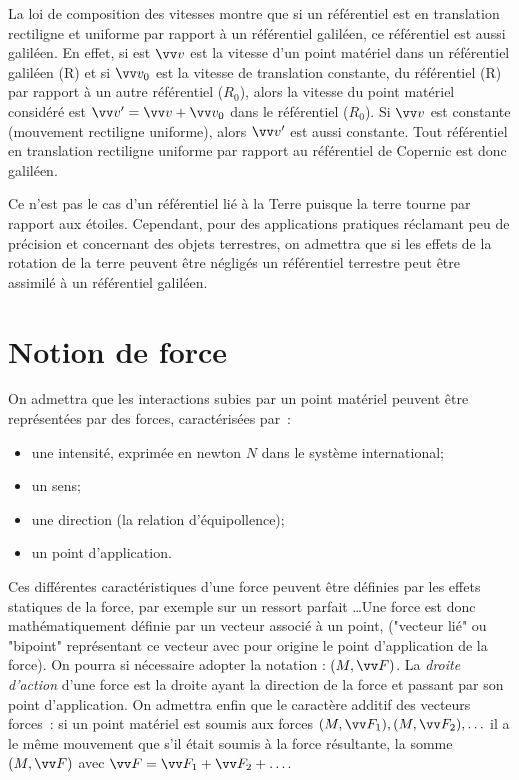 La loi de composition des vitesses montre que si un référentiel est en translation rectiligne et uniforme par rapport à un référentiel galiléen, ce référentiel est aussi galiléen. En effet, si est $\vvv$ est la vitesse d'un point matériel dans un référentiel galiléen (R) et si $\vvv_0$ est la vitesse de translation constante, du référentiel (R) par rapport à un autre référentiel ($R_0$), alors la vitesse du point matériel considéré est $\vvv'=\vvv+\vvv_0$ dans le référentiel ($R_0$). Si $\vvv$ est constante (mouvement rectiligne uniforme), alors $\vvv'$ est aussi constante. Tout référentiel en translation rectiligne uniforme par rapport au référentiel de Copernic est donc galiléen.

Ce n'est pas le cas d'un référentiel lié à la Terre puisque la terre tourne par rapport aux étoiles. Cependant, pour des applications pratiques réclamant peu de précision et concernant des objets terrestres, on admettra que si les effets de la rotation de la terre peuvent être négligés un référentiel terrestre peut être assimilé à un référentiel galiléen. 

\section{Notion de force}
\label{chap2-sec:notiondeforce}

On admettra que les interactions subies par un point matériel peuvent être représentées par des forces, caractérisées par~:
\begin{itemize}
\item une intensité, exprimée en newton $\si{N}$ dans le système international;
\item un sens;
\item une direction (la relation d'équipollence);
\item un point d'application.
\end{itemize}

Ces différentes caractéristiques d'une force peuvent être définies par les effets statiques de la force, par exemple sur un ressort parfait \ldots Une force est donc mathématiquement définie par un vecteur associé à un point, ("vecteur lié" ou "bipoint" représentant ce vecteur avec pour origine le point d'application de la force). On pourra si nécessaire adopter la notation : $(M, \vF)$. La \emph{droite d'action} d'une force est la droite ayant la direction de la force et passant par son point d'application. On admettra enfin que le caractère additif des vecteurs forces~: si un point matériel est soumis aux forces $(M,\vF_1), (M,\vF_2), \ldots$ il a le même mouvement que s'il était soumis à la force résultante, la somme $(M, \vF)$ avec $\vF = \vF_1+\vF_2+\ldots$. 

